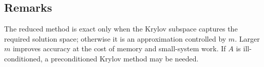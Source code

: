 \subsection{Remarks}

The reduced method is exact only when the Krylov subspace captures the
required solution space; otherwise it is an approximation controlled by
\(m\). Larger \(m\) improves accuracy at the cost of memory and small-system
work. If \(A\) is ill-conditioned, a preconditioned Krylov method may be
needed.

